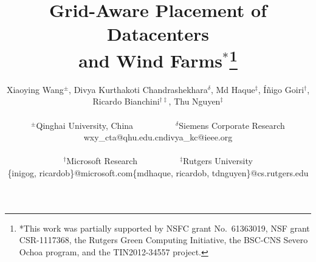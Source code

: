 \documentclass[conference]{IEEEtran}
\begin{document}
\title{Grid-Aware Placement of Datacenters\\and Wind
  Farms$^*$\thanks{*This work was partially supported by NSFC
    grant No.~61363019, NSF grant CSR-1117368, the Rutgers Green Computing
    Initiative, the BSC-CNS Severo Ochoa program, and the
    TIN2012-34557 project.}
\vspace{-0.5in}
}

%
 \author{
Xiaoying Wang$^\pm$, Divya Kurthakoti Chandrashekhara$^\delta$, Md
Haque$^\ddag$, \'I\~{n}igo Goiri$^{\dag}$, Ricardo
Bianchini$^{\dag\ddag}$, Thu Nguyen$^\ddag$\\
[.2in]
\begin{tabular}{ccc}
  $^\pm$Qinghai University, China & ~~~~~~~~~~ & $^\delta$Siemens Corporate Research \\
  wxy\_cta@qhu.edu.cn & & divya\_kc@ieee.org \\
\\
    $^\dag$Microsoft Research & ~~~~~~~~~~ & $^\ddag$Rutgers University \\
    \{inigog, ricardob\}@microsoft.com & & \{mdhaque, ricardob, tdnguyen\}@cs.rutgers.edu\\
\end{tabular}
}


\date{}

\maketitle








%



\end{document}
